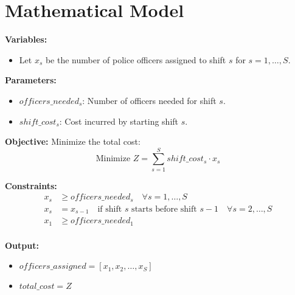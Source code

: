 \documentclass{article}
\begin{document}
\section*{Mathematical Model}

\textbf{Variables:}
\begin{itemize}
    \item Let $x_s$ be the number of police officers assigned to shift $s$ for $s = 1, \ldots, S$.
\end{itemize}

\textbf{Parameters:}
\begin{itemize}
    \item $officers\_needed_{s}$: Number of officers needed for shift $s$.
    \item $shift\_cost_{s}$: Cost incurred by starting shift $s$.
\end{itemize}

\textbf{Objective:}
Minimize the total cost:
\[
\text{Minimize } Z = \sum_{s=1}^{S} shift\_cost_{s} \cdot x_s
\]

\textbf{Constraints:}
\begin{align*}
x_s & \geq officers\_needed_{s} \quad \forall s = 1, \ldots, S \\
x_s & = x_{s-1} \quad \text{if shift } s \text{ starts before shift } s - 1 \quad \forall s = 2, \ldots, S \\
x_1 & \geq officers\_needed_{1} \\
\end{align*}

\textbf{Output:}
\begin{itemize}
    \item $officers\_assigned = [x_1, x_2, \ldots, x_S]$
    \item $total\_cost = Z$
\end{itemize}
\end{document}
